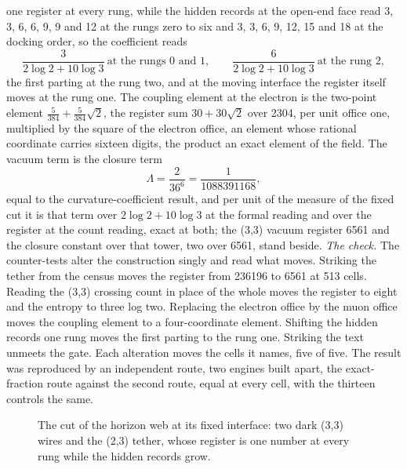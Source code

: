 \begin{chproof}
one register at every rung, while the hidden records at the open-end face read 3, 3, 6, 6, 9, 9 and 12 at the rungs zero to six and 3, 3, 6, 9, 12, 15 and 18 at the docking order, so the coefficient reads
\begin{equation} \frac{3}{2\log 2 + 10\log 3} \ \text{at the rungs } 0 \text{ and } 1, \qquad \frac{6}{2\log 2 + 10\log 3} \ \text{at the rung } 2, \end{equation}
the first parting at the rung two, and at the moving interface the register itself moves at the rung one. The coupling element at the electron is the two-point element $\tfrac{5}{384} + \tfrac{5}{384}\sqrt{2}$, the register sum $30 + 30\sqrt{2}$ over 2304, per unit office one, multiplied by the square of the electron office, an element whose rational coordinate carries sixteen digits, the product an exact element of the field. The vacuum term is the closure term
\begin{equation} \Lambda = \frac{2}{36^{6}} = \frac{1}{1088391168}, \end{equation}
equal to the curvature-coefficient result, and per unit of the measure of the fixed cut it is that term over $2\log 2 + 10\log 3$ at the formal reading and over the register at the count reading, exact at both; the (3,3) vacuum register 6561 and the closure constant over that tower, two over 6561, stand beside.
\textit{The check.} The counter-tests alter the construction singly and read what moves. Striking the tether from the census moves the register from 236196 to 6561 at 513 cells. Reading the (3,3) crossing count in place of the whole moves the register to eight and the entropy to three log two. Replacing the electron office by the muon office moves the coupling element to a four-coordinate element. Shifting the hidden records one rung moves the first parting to the rung one. Striking the text unmeets the gate. Each alteration moves the cells it names, five of five. The result was reproduced by an independent route, two engines built apart, the exact-fraction route against the second route, equal at every cell, with the thirteen controls the same.
\begin{figure}[h]\centering{}\caption{The cut of the horizon web at its fixed interface: two dark (3,3) wires and the (2,3) tether, whose register is one number at every rung while the hidden records grow.}\end{figure}
\end{chproof}
\par\medskip{}\label{narr:close:9-2}\par
